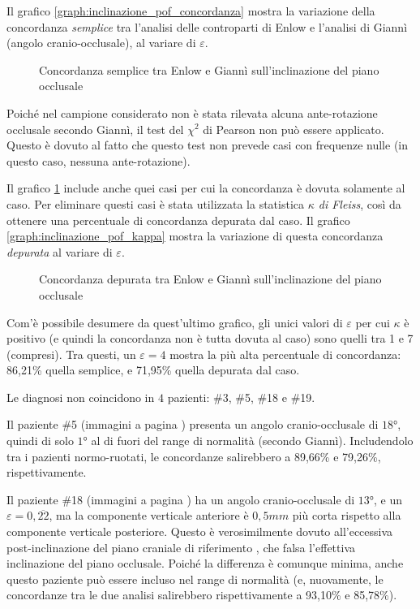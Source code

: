 Il grafico \vref{graph:inclinazione_pof_concordanza} mostra la variazione della concordanza \emph{semplice} tra l'analisi delle controparti di Enlow e l'analisi di Giannì (angolo cranio-occlusale), al variare di $\varepsilon$.

\begin{figure}[ht!]
\centering

\caption{Concordanza semplice tra Enlow e Giannì sull'inclinazione del piano occlusale}
\label{graph:inclinazione_pof_concordanza}
\end{figure}

Poiché nel campione considerato non è stata rilevata alcuna ante-rotazione occlusale secondo Giannì, il test del $\chi^2$ di Pearson non può essere applicato. Questo è dovuto al fatto che questo test non prevede casi con frequenze nulle (in questo caso, nessuna ante-rotazione).

Il grafico \ref{graph:inclinazione_pof_concordanza} include anche quei casi per cui la concordanza è dovuta solamente al caso. Per eliminare questi casi è stata utilizzata la statistica \emph{$\kappa$ di Fleiss}, così da ottenere una percentuale di concordanza depurata dal caso. Il grafico \vref{graph:inclinazione_pof_kappa} mostra la variazione di questa concordanza \emph{depurata} al variare di $\varepsilon$.

\begin{figure}[ht!]
\centering

\caption{Concordanza depurata tra Enlow e Giannì sull'inclinazione del piano occlusale}
\label{graph:inclinazione_pof_kappa}
\end{figure}

Com'è possibile desumere da quest'ultimo grafico, gli unici valori di $\varepsilon$ per cui $\kappa$ è positivo (e quindi la concordanza non è tutta dovuta al caso) sono quelli tra 1 e 7 (compresi). Tra questi, un $\varepsilon = 4$ mostra la più alta percentuale di concordanza: 86,21\% quella semplice, e 71,95\% quella depurata dal caso.

Le diagnosi non coincidono in $4$ pazienti: \#3, \#5, \#18 e \#19.

Il paziente \#5 (immagini a pagina \pageref{paz:EMALO2001}) presenta un angolo cranio-occlusale di $18°$, quindi di solo $1°$ al di fuori del range di normalità (secondo Giannì). Includendolo tra i pazienti normo-ruotati, le concordanze salirebbero a 89,66\% e 79,26\%, rispettivamente.

Il paziente \#18 (immagini a pagina \pageref{paz:TILO1999}) ha un angolo cranio-occlusale di $13°$, e un $\varepsilon = 0,\overline{22}$, ma la componente verticale anteriore è $0,5 mm$ più corta rispetto alla componente verticale posteriore. Questo è verosimilmente dovuto all'eccessiva post-inclinazione del piano craniale di riferimento , che falsa l'effettiva inclinazione del piano occlusale. Poiché la differenza è comunque minima, anche questo paziente può essere incluso nel range di normalità (e, nuovamente, le concordanze tra le due analisi salirebbero rispettivamente a 93,10\% e 85,78\%).

